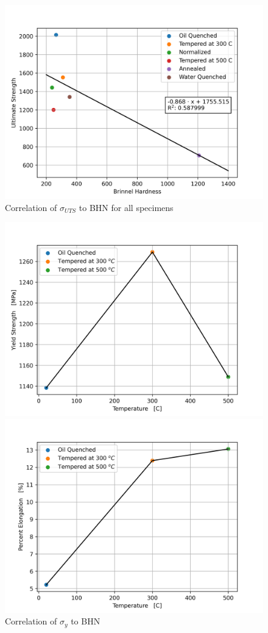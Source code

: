 \documentclass{article}
\begin{document}
\begin{figure}[!h!]
    \centering
    \includegraphics[width=0.5\linewidth]{plots/q4.png}
    \caption{Correlation of $\sigma_{UTS}$ to BHN for all specimens}
    \label{fig:q4}
\end{figure}


\begin{figure}[!h!]
\begin{minipage}[b]{.5\linewidth}
    \includegraphics[width=\linewidth]{plots/q6_offset.png}
    \caption{Correlation of $\sigma_y$ to BHN}
    \label{fig:q6-yield}
    \vspace{4ex}
\end{minipage}
\begin{minipage}[b]{.5\linewidth}
    \includegraphics[width=\linewidth]{plots/q6_per_elong.png}

\end{minipage}
\end{figure}
\end{document}
